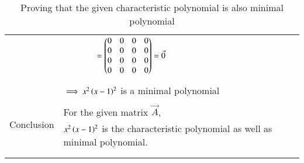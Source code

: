 \documentclass[journal,12pt]{IEEEtran}
\begin{document}
\begin{longtable}{|c|l|}
	& $\qquad\qquad = \begin{pmatrix}0&0&0&0\\0&0&0&0\\0&0&0&0\\0&0&0&0\end{pmatrix}=\Vec{0}$\\
	&\\
	&$\implies x^2\left(x-1\right)^2$ is a minimal polynomial\\
	\hline
	\multirow{3}{*}{Conclusion} & \\
	& For the given matrix $\Vec{A}$,\\
	&$x^2\left(x-1\right)^2$ is the characteristic polynomial as well as minimal polynomial.\\
	&\\
	\hline
	\caption{Proving that the given characteristic polynomial is also minimal polynomial}
    \label{table:2}
\end{longtable}
\end{document}
